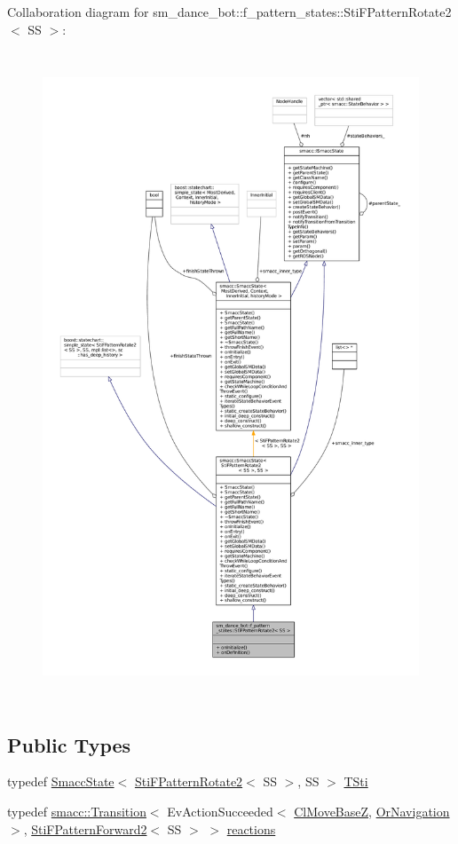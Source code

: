 Collaboration diagram for sm\+\_\+dance\+\_\+bot\+:\+:f\+\_\+pattern\+\_\+states\+:\+:Sti\+F\+Pattern\+Rotate2$<$ SS $>$\+:
\nopagebreak
\begin{figure}[H]
\begin{center}
\leavevmode
\includegraphics[height=550pt]{structsm__dance__bot_1_1f__pattern__states_1_1StiFPatternRotate2__coll__graph}
\end{center}
\end{figure}
\subsection*{Public Types}
\begin{DoxyCompactItemize}
\item 
typedef \hyperlink{classSmaccState}{Smacc\+State}$<$ \hyperlink{structsm__dance__bot_1_1f__pattern__states_1_1StiFPatternRotate2}{Sti\+F\+Pattern\+Rotate2}$<$ SS $>$, SS $>$ \hyperlink{structsm__dance__bot_1_1f__pattern__states_1_1StiFPatternRotate2_a38f721b63f2513b401cec57d938f7acf}{T\+Sti}
\item 
typedef \hyperlink{classsmacc_1_1Transition}{smacc\+::\+Transition}$<$ Ev\+Action\+Succeeded$<$ \hyperlink{classmove__base__z__client_1_1ClMoveBaseZ}{Cl\+Move\+BaseZ}, \hyperlink{classsm__dance__bot_1_1OrNavigation}{Or\+Navigation} $>$, \hyperlink{structsm__dance__bot_1_1f__pattern__states_1_1StiFPatternForward2}{Sti\+F\+Pattern\+Forward2}$<$ SS $>$ $>$ \hyperlink{structsm__dance__bot_1_1f__pattern__states_1_1StiFPatternRotate2_ae5a931374c13aa2edb15371529d0af5a}{reactions}
\end{DoxyCompactItemize}
